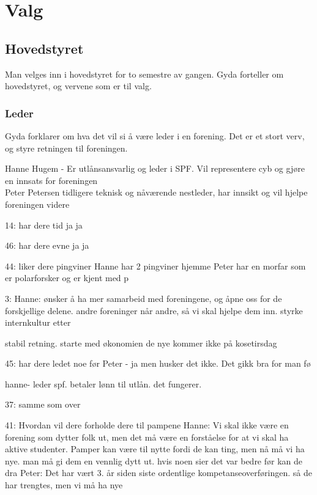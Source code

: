 \documentclass[10pt,norsk,a4paper,usenames,dvipsnames]{article}
\begin{document}
\section{Valg}

    
    \subsection{Hovedstyret}
        Man velges inn i hovedstyret for to semestre av gangen.
        Gyda forteller om hovedstyret, og vervene som er til valg.
        
        \subsubsection{Leder}
        Gyda forklarer om hva det vil si å være leder i en forening. Det er et stort verv, og styre retningen til foreningen.
        
        Hanne Hugem - Er utlånsansvarlig og leder i SPF. Vil representere cyb og gjøre en innsats for foreningen\\
        Peter Petersen tidligere teknisk og nåværende nestleder, har innsikt og vil hjelpe foreningen videre
        
        14:  har dere tid
        ja ja
        
        46: har dere evne
        ja ja
        
        44: liker dere pingviner
        Hanne har 2 pingviner hjemme
        Peter har en morfar som er polarforsker og er kjent med p
        
        3: Hanne: ønsker å ha mer samarbeid med foreningene, og åpne oss for de forskjellige delene. andre foreninger når andre, så vi skal hjelpe dem inn. styrke internkultur etter 
        
        stabil retning. starte med økonomien
        de nye kommer ikke på kosetirsdag
        
        45: har dere ledet noe før
        Peter - ja men husker det ikke. Det gikk bra for man fø
        
        hanne- leder spf. betaler lønn til utlån. det fungerer.
        
        37: samme som over
        
        41: Hvordan vil dere forholde dere til pampene
        Hanne: Vi skal ikke være en forening som dytter folk ut, men det må være en forståelse for at vi skal ha aktive studenter. Pamper kan være til nytte fordi de kan ting, men nå må vi ha nye. man må gi dem en vennlig dytt ut.
        hvis noen sier det var bedre før kan de dra
        Peter: Det har vært 3. år siden siste ordentlige kompetanseoverføringen. så de har trengtes, men vi må ha nye
        
\end{document}
